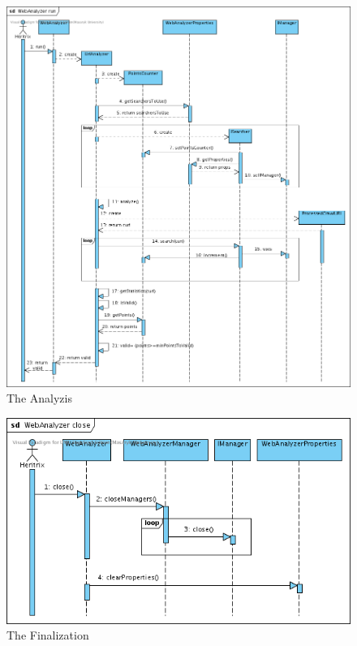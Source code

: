 \documentclass[11pt,a4paper]{article}
\begin{document}
\begin{center}
\begin{figure}[htp]
\centering
\includegraphics[width=120mm]{SD3.png}
\caption{The Analyzis}\label{fig:erptsqfit3}
\end{figure}

\begin{figure}[htp]
\centering
\includegraphics[width=120mm]{SD4.png}
\caption{The Finalization}\label{fig:erptsqfit4}
\end{figure}

\end{center}
\end{document}
